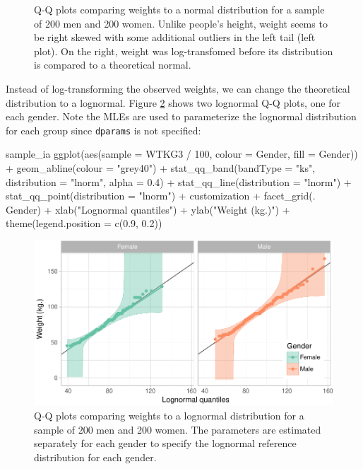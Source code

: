 \begin{Schunk}
\begin{figure}
{}

\caption[Q-Q plots comparing weights to a normal distribution for a sample of 200 men and 200 women]{Q-Q plots comparing weights to a normal distribution for a sample of 200 men and 200 women. Unlike people's height, weight seems to be right skewed with some additional outliers in the left tail (left plot). On the right, weight was log-transfomed before its distribution is compared to a theoretical normal. }\label{fig:weights}
\end{figure}
\end{Schunk}

Instead of log-transforming the observed weights, we can change the
theoretical distribution to a lognormal. Figure \ref{fig:weights-log}
shows two lognormal Q-Q plots, one for each gender. Note the MLEs are
used to parameterize the lognormal distribution for each group since
\texttt{dparams} is not specified:

\begin{Schunk}
\begin{Sinput}
sample_ia %
  ggplot(aes(sample = WTKG3 / 100, colour = Gender, fill = Gender)) +
  geom_abline(colour = "grey40") +
  stat_qq_band(bandType = "ks", distribution = "lnorm", alpha = 0.4) +
  stat_qq_line(distribution = "lnorm") +
  stat_qq_point(distribution = "lnorm") +
  customization +
  facet_grid(. ~ Gender) +
  xlab("Lognormal quantiles") +
  ylab("Weight (kg.)") +
  theme(legend.position = c(0.9, 0.2))
\end{Sinput}
\begin{figure}

{\centering \includegraphics[width=0.9\linewidth]{loy-figures/weights-log-1} 

}

\caption[Q-Q plots comparing weights to a lognormal distribution for a sample of 200 men and 200 women]{Q-Q plots comparing weights to a lognormal distribution for a sample of 200 men and 200 women. The parameters are estimated separately for each gender to specify the lognormal reference distribution for each gender.}\label{fig:weights-log}
\end{figure}
\end{Schunk}

